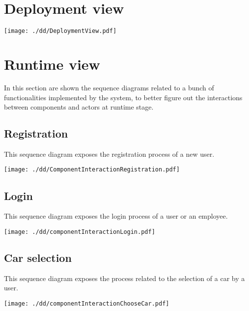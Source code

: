 \documentclass{scrreprt}
\begin{document}
\section{Deployment view}

\begin{center}
	\texttt{[image: ./dd/DeploymentView.pdf]}
\end{center}

\section{Runtime view}
In this section are shown the sequence diagrams related to a bunch of functionalities implemented by the system, to better figure out the interactions between components and actors at runtime stage.

\subsection{Registration}
This sequence diagram exposes the registration process of a new user.
\begin{center}
		\texttt{[image: ./dd/ComponentInteractionRegistration.pdf]}
\end{center}
\subsection{Login}
This sequence diagram exposes the login process of a user or an employee.
\begin{center}
		\texttt{[image: ./dd/componentInteractionLogin.pdf]}
\end{center}
\subsection{Car selection}
This sequence diagram exposes the process related to the selection of a car by a user.
\begin{center}
		\texttt{[image: ./dd/componentInteractionChooseCar.pdf]}
\end{center}
\end{document}
